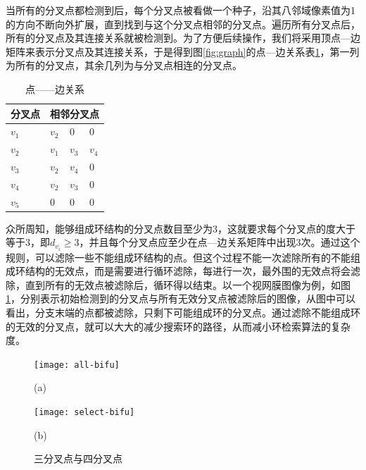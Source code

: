 当所有的分叉点都检测到后，每个分叉点被看做一个种子，沿其八邻域像素值为1的方向不断向外扩展，直到找到与这个分叉点相邻的分叉点。遍历所有分叉点后，所有的分叉点及其连接关系就被检测到。为了方便后续操作，我们将采用顶点---边矩阵来表示分叉点及其连接关系，于是得到图\ref{fig:graph}的点---边关系表\ref{tab:AdjacentStructure}，第一列为所有的分叉点，其余几列为与分叉点相连的分叉点。
\renewcommand\arraystretch{0.8}
\begin{table}
\caption{点——边关系}
\centering
\begin{tabular}{p{2cm}<{\centering}p{1cm}<{\centering}p{1cm}<{\centering}p{1cm}<{\centering}}
  \hline
  分叉点 & \multicolumn{3}{c}{相邻分叉点}\\
  \hline
  \rowcolor{gray!50}
  $v_{1}$ & $v_{2}$  & $0$      & $0$  \\
  $v_{2}$ & $v_{1}$  & $v_{3}$  & $v_{4}$ \\
  \rowcolor{gray!50}
  $v_{3}$ & $v_{2}$  & $v_{4}$  & $0$\\
  $v_{4}$ & $v_{2}$  & $v_{3}$  & $0$ \\
  \rowcolor{gray!50}
  $v_{5}$ & $0$      & $0$      & $0$\\
  \hline
\end{tabular}
\label{tab:AdjacentStructure}
\end{table}

众所周知，能够组成环结构的分叉点数目至少为3，这就要求每个分叉点的度大于等于3，即$d_{v_i} \geq 3$，并且每个分叉点应至少在点---边关系矩阵中出现3次。通过这个规则，可以滤除一些不能组成环结构的点。但这个过程不能一次滤除所有的不能组成环结构的无效点，而是需要进行循环滤除，每进行一次，最外围的无效点将会滤除，直到所有的无效点被滤除后，循环得以结束。以一个视网膜图像为例，如图\ref{fig:Bifurcation}，分别表示初始检测到的分叉点与所有无效分叉点被滤除后的图像，从图中可以看出，分支末端的点都被滤除，只剩下可能组成环的分叉点。通过滤除不能组成环的无效的分叉点，就可以大大的减少搜索环的路径，从而减小环检索算法的复杂度。

\begin{figure}
\centering
  \begin{minipage}[b]{0.48\textwidth} 
      \centering 
      \texttt{[image: all-bifu]}
        \centerline{(a)}\medskip
	 \label{fig:3FeaturePoint}
    \end{minipage}
  \begin{minipage}[b]{0.48\textwidth}
    \centering
    \texttt{[image: select-bifu]}
      \centerline{(b)}\medskip
	\label{fig:4FeaturePoint}
  \end{minipage}
\caption{三分叉点与四分叉点}
\label{fig:Bifurcation}
\end{figure}

